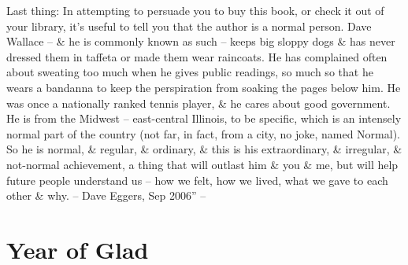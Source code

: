 \documentclass{article}
\numberwithin{equation}{section}
\begin{document}
Last thing: In attempting to persuade you to buy this book, or check it out of your library, it's useful to tell you that the author is a normal person. Dave Wallace -- \& he is commonly known as such -- keeps big sloppy dogs \& has never dressed them in taffeta or made them wear raincoats. He has complained often about sweating too much when he gives public readings, so much so that he wears a bandanna to keep the perspiration from soaking the pages below him. He was once a nationally ranked tennis player, \& he cares about good government. He is from the Midwest -- east-central Illinois, to be specific, which is an intensely normal part of the country (not far, in fact, from a city, no joke, named Normal). So he is normal, \& regular, \& ordinary, \& this is his extraordinary, \& irregular, \& not-normal achievement, a thing that will outlast him \& you \& me, but will help future people understand us -- how we felt, how we lived, what we gave to each other \& why. -- Dave Eggers, Sep 2006'' -- \cite[pp. xi--xvi]{Wallace2011}


\section{Year of Glad}


\printbibliography[heading=bibintoc]
	
\end{document}
